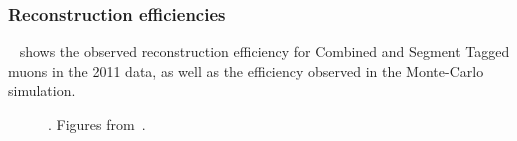 \subsubsection{Reconstruction efficiencies}

~ shows the observed reconstruction efficiency for Combined and Segment
Tagged muons in the 2011 data, as well as the efficiency observed in the
Monte-Carlo simulation.

\begin{figure}[h]
\centering
\caption{. Figures from~\cite{MuonEfficiency2011}.}
\label{fig:mu-reco-eff}
\end{figure}







